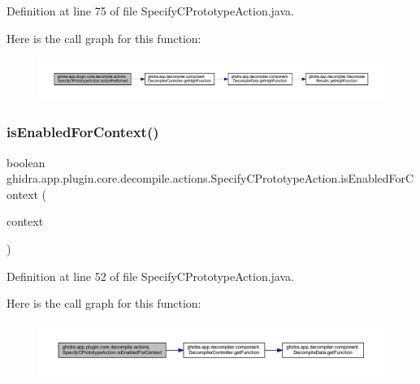 Definition at line 75 of file Specify\+C\+Prototype\+Action.\+java.

Here is the call graph for this function\+:
\nopagebreak
\begin{figure}[H]
\begin{center}
\leavevmode
\includegraphics[width=350pt]{classghidra_1_1app_1_1plugin_1_1core_1_1decompile_1_1actions_1_1_specify_c_prototype_action_a5b2869ac2f0cc8c72473a5ebb5b15f6c_cgraph}
\end{center}
\end{figure}
\mbox{\label{classghidra_1_1app_1_1plugin_1_1core_1_1decompile_1_1actions_1_1_specify_c_prototype_action_aca5c2f99385a711365f7a32c1888f313}} 
\subsubsection{\texorpdfstring{isEnabledForContext()}{isEnabledForContext()}}
{\footnotesize\ttfamily boolean ghidra.\+app.\+plugin.\+core.\+decompile.\+actions.\+Specify\+C\+Prototype\+Action.\+is\+Enabled\+For\+Context (\begin{DoxyParamCaption}\item[{Action\+Context}]{context }\end{DoxyParamCaption})\hspace{0.3cm}{\ttfamily [inline]}}



Definition at line 52 of file Specify\+C\+Prototype\+Action.\+java.

Here is the call graph for this function\+:
\nopagebreak
\begin{figure}[H]
\begin{center}
\leavevmode
\includegraphics[width=350pt]{classghidra_1_1app_1_1plugin_1_1core_1_1decompile_1_1actions_1_1_specify_c_prototype_action_aca5c2f99385a711365f7a32c1888f313_cgraph}
\end{center}
\end{figure}


